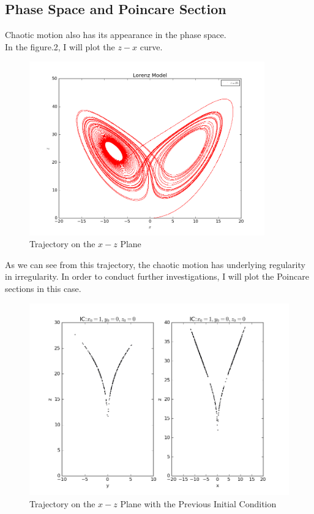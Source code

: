 \documentclass[10pt,a4paper]{article}
\begin{document}
   \subsection{Phase Space and Poincare Section}
   Chaotic motion also has its appearance in the phase space.\\
   In the figure.2, I will plot the $z-x$ curve.
   \begin{figure}[htbp]
   	\centering
   	\includegraphics[width=4in]{Lorenz_2.png}
   	\caption{Trajectory on the $x-z$ Plane}
   \end{figure}
   As we can see from this trajectory, the chaotic motion has underlying regularity in irregularity. In order to conduct further investigations, I will plot the Poincare sections in this case.
    \begin{figure}[htbp]
    	\centering
    	\includegraphics[width=5in]{Lorenz_7.png}
    	\caption{Trajectory on the $x-z$ Plane with the Previous Initial Condition}
    \end{figure}
\end{document}

